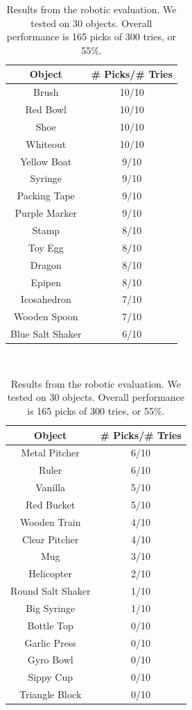 \documentclass[graybox]{svmult}
\begin{document}
\begin{table}
\small
\centering
\begin{tabular}{cc}
\toprule
Object		    & \# Picks/\# Tries\\
\midrule
Brush    	    & 10/10\\
Red Bowl    	    & 10/10\\
Shoe    	    & 10/10 \\
Whiteout    	    & 10/10 \\
Yellow Boat    	    & 9/10  \\
Syringe    	    & 9/10  \\
Packing Tape        & 9/10 \\
Purple Marker       & 9/10 \\
Stamp    	    & 8/10  \\
Toy Egg    	    & 8/10  \\
Dragon    	    & 8/10  \\
Epipen    	    & 8/10  \\
Icosahedron    	    & 7/10  \\
Wooden Spoon        & 7/10  \\
Blue Salt Shaker    & 6/10  \\
\bottomrule
\end{tabular}
~~~~~~~~~~~~~~~~~~\begin{tabular}{cc}
\toprule
Object		    & \# Picks/\# Tries\\
\midrule
Metal Pitcher       & 6/10  \\
Ruler    	    & 6/10  \\
Vanilla	   	    & 5/10  \\
Red Bucket    	    & 5/10\\
Wooden Train        & 4/10  \\
Clear Pitcher       & 4/10  \\
Mug    		    & 3/10  \\
Helicopter    	    & 2/10  \\
Round Salt Shaker   & 1/10  \\
Big Syringe    	    & 1/10  \\
Bottle Top    	    & 0/10  \\
Garlic Press        & 0/10  \\
Gyro Bowl    	    & 0/10  \\
Sippy Cup    	    & 0/10  \\
Triangle Block      & 0/10  \\
\bottomrule
\end{tabular}

\caption{Results from the robotic evaluation. We tested on 30 objects.
  Overall performance is 165 picks of 300 tries, or
  55\%. \label{table:robot_results}}
\end{table}
\end{document}
